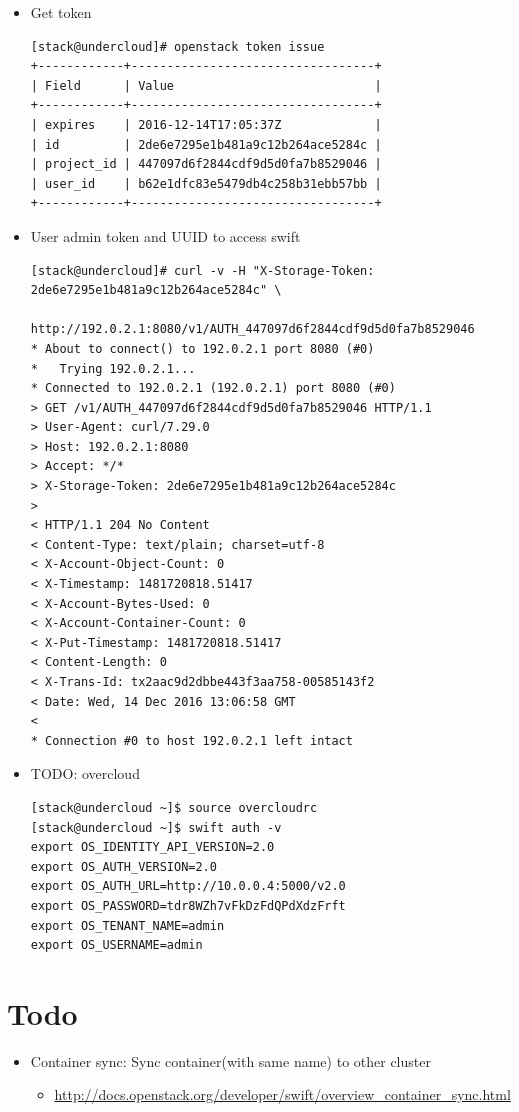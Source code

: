 \documentclass{article}
\begin{document}
\begin{itemize}
\begin{itemize}
\item Get token

\begin{verbatim}
[stack@undercloud]# openstack token issue
+------------+----------------------------------+
| Field      | Value                            |
+------------+----------------------------------+
| expires    | 2016-12-14T17:05:37Z             |
| id         | 2de6e7295e1b481a9c12b264ace5284c |
| project_id | 447097d6f2844cdf9d5d0fa7b8529046 |
| user_id    | b62e1dfc83e5479db4c258b31ebb57bb |
+------------+----------------------------------+
\end{verbatim}

\item User admin token and UUID to access swift

\begin{verbatim}
[stack@undercloud]# curl -v -H "X-Storage-Token: 2de6e7295e1b481a9c12b264ace5284c" \
			   http://192.0.2.1:8080/v1/AUTH_447097d6f2844cdf9d5d0fa7b8529046
* About to connect() to 192.0.2.1 port 8080 (#0)
*   Trying 192.0.2.1...
* Connected to 192.0.2.1 (192.0.2.1) port 8080 (#0)
> GET /v1/AUTH_447097d6f2844cdf9d5d0fa7b8529046 HTTP/1.1
> User-Agent: curl/7.29.0
> Host: 192.0.2.1:8080
> Accept: */*
> X-Storage-Token: 2de6e7295e1b481a9c12b264ace5284c
>
< HTTP/1.1 204 No Content
< Content-Type: text/plain; charset=utf-8
< X-Account-Object-Count: 0
< X-Timestamp: 1481720818.51417
< X-Account-Bytes-Used: 0
< X-Account-Container-Count: 0
< X-Put-Timestamp: 1481720818.51417
< Content-Length: 0
< X-Trans-Id: tx2aac9d2dbbe443f3aa758-00585143f2
< Date: Wed, 14 Dec 2016 13:06:58 GMT
<
* Connection #0 to host 192.0.2.1 left intact
\end{verbatim}
\end{itemize}
\end{itemize}


\begin{itemize}
\item TODO: overcloud

\begin{verbatim}
[stack@undercloud ~]$ source overcloudrc
[stack@undercloud ~]$ swift auth -v
export OS_IDENTITY_API_VERSION=2.0
export OS_AUTH_VERSION=2.0
export OS_AUTH_URL=http://10.0.0.4:5000/v2.0
export OS_PASSWORD=tdr8WZh7vFkDzFdQPdXdzFrft
export OS_TENANT_NAME=admin
export OS_USERNAME=admin
\end{verbatim}
\end{itemize}

\section{Todo}
\label{sec:orgad23162}
\begin{itemize}
\item Container sync: Sync container(with same name) to other cluster
\begin{itemize}
\item \url{http://docs.openstack.org/developer/swift/overview\_container\_sync.html}
\end{itemize}
\end{itemize}
\end{document}
